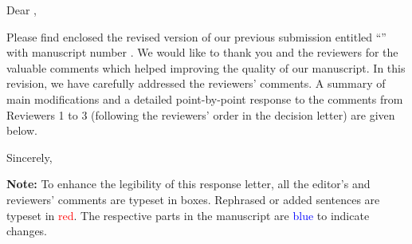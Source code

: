 Dear \theeditor,

Please find enclosed the revised version of our previous submission entitled \enquote{\thetitle} with manuscript number \themanuscript.
We would like to thank you and the reviewers for the valuable comments which helped improving the quality of our manuscript.
In this revision, we have carefully addressed the reviewers' comments.
A summary of main modifications and a detailed point-by-point response to the comments from Reviewers 1 to 3 (following the reviewers' order in the decision letter) are given below.

\vspace{1.2em}

Sincerely,

\vspace{1.7em}

\theauthor{}

\vfil
\textbf{Note:} To enhance the legibility of this response letter, all the editor's and reviewers' comments are typeset in boxes. Rephrased or added sentences are typeset in \textcolor{red}{red}. The respective parts in the manuscript are \textcolor{blue}{blue} to indicate changes.
